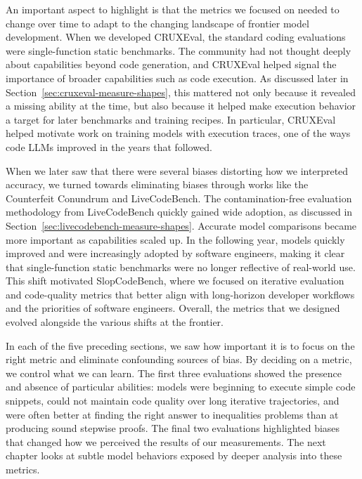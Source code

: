 An important aspect to highlight is that the metrics we focused on needed to change over time to adapt to the
changing landscape of frontier model development. When we developed CRUXEval, the standard coding evaluations were
single-function static benchmarks. The community had not thought deeply about capabilities beyond code generation, and
CRUXEval helped signal the importance of broader capabilities such as code execution. As discussed later in
Section~\ref{sec:cruxeval-measure-shapes}, this mattered not only because it revealed a missing ability at the time,
but also because it helped make execution behavior a target for later benchmarks and training recipes. In particular,
CRUXEval helped motivate work on training models with execution traces, one of the ways code LLMs improved in the years
that followed.

When we later saw that there were several biases distorting how we interpreted accuracy, we turned towards eliminating biases
through works like the Counterfeit Conundrum and LiveCodeBench. The contamination-free evaluation methodology from
LiveCodeBench quickly gained wide adoption, as discussed in Section~\ref{sec:livecodebench-measure-shapes}.
Accurate model comparisons became more important as capabilities scaled up.
In the following year, models quickly improved and were increasingly adopted by software engineers, making it clear that single-function static
benchmarks were no longer reflective of real-world use. This shift motivated SlopCodeBench, where we focused on
iterative evaluation and code-quality metrics that better align with long-horizon developer workflows and the priorities
of software engineers. Overall, the metrics that we designed evolved alongside the various shifts at the frontier.

In each of the five preceding sections, we saw how important it is to focus on the right metric and eliminate confounding
sources of bias. By deciding on a metric, we control what we can learn. The first three evaluations showed the presence
and absence of particular abilities: models were beginning to execute simple code snippets, could not maintain code quality
over long iterative trajectories, and were often better at finding the right answer to inequalities problems than at
producing sound stepwise proofs. The final two evaluations highlighted biases that changed how we perceived the results of
our measurements. The next chapter looks at subtle model behaviors exposed by deeper analysis into these metrics.
